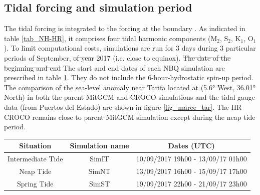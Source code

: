 \subsection{Tidal forcing and simulation period}
The tidal forcing is integrated to the forcing \color{blue} at the boundary  \color{black}. As indicated in table \ref{tab_NH-HR}, it comprises four tidal harmonic \color{blue} components \color{blue} ($\text{M}_{\text{2}}$, $\text{S}_{\text{2}}$, $\text{K}_{\text{1}}$, $\text{O}_{\text{1}}$).
\color{blue}To limit computational costs\color{black}, simulations are run for 3 days \color{blue}during 3 particular \color{black} periods of September, \sout{of year} 2017 (i.e. close to equinox). \sout{The date of the beginning and end} \color{blue}The start and end dates of each NBQ simulation are prescribed in table \ref{tab_dates_MIV}. \color{blue} They do \color{black} not include the 6-hour-hydrostatic spin-up period. The comparison of the sea-level anomaly near Tarifa \color{blue} located at (5.6° West, 36.01° North) \color{black} in both the parent MitGCM and CROCO simulations and the tidal gauge data (from Puertos del Estado) are shown in figure \ref{fig_maree_tar}. \color{blue} The HR CROCO remains close to parent MitGCM simulation except during the neap tide period. \color{black}

\begin{table}[h]
        \centering
        \begin{tabular}{|c|c|c|}
                \hline
                Situation & Simulation name & Dates (UTC)\\
                \hline
                Intermediate Tide & SimIT & 10/09/2017 19h00 - 13/09/17 01h00  \\
                Neap Tide& SimNT & 13/09/2017 16h00 - 15/09/17 17h00 \\
                Spring Tide& SimST & 19/09/2017 22h00 - 21/09/17 23h00  \\
                \hline
        \end{tabular}
        \label{tab_dates_MIV}
\end{table}

